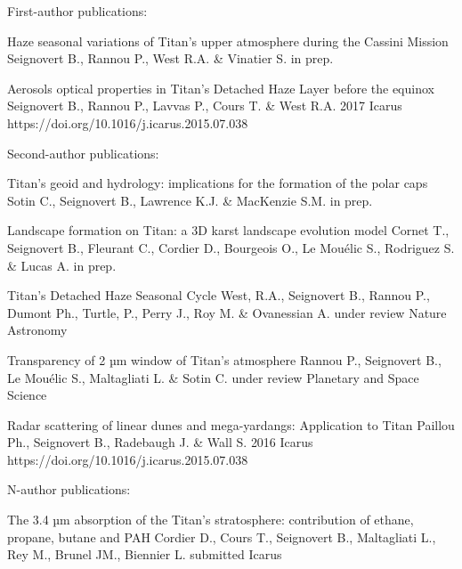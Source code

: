 
\begin{cvpublications}{First-author publications:}

		{Haze seasonal variations of Titan's upper atmosphere during the Cassini Mission}
		{Seignovert B., Rannou P., West R.A. \& Vinatier S.}
		{in prep.}
		{}{}

		{Aerosols optical properties in Titan's Detached Haze Layer before the equinox}
		{Seignovert B., Rannou P., Lavvas P., Cours T. \& West R.A.}
		{2017}
		{Icarus}
		{https://doi.org/10.1016/j.icarus.2015.07.038}

\end{cvpublications}

\begin{cvpublications}{Second-author publications:}

		{Titan’s geoid and hydrology: implications for the formation of the polar caps}
		{Sotin C., Seignovert B., Lawrence K.J. \& MacKenzie S.M.}
		{in prep.}
		{}{}

		{Landscape formation on Titan: a 3D karst landscape evolution model}
		{Cornet T., Seignovert B., Fleurant C., Cordier D., Bourgeois O., Le Mouélic S., Rodriguez S. \& Lucas A.}
		{in prep.}
		{}{}

		{Titan's Detached Haze Seasonal Cycle}
		{West, R.A., Seignovert B., Rannou P., Dumont Ph., Turtle,  P., Perry J., Roy M. \& Ovanessian A.}
		{under review}
		{Nature Astronomy}{}

		{Transparency of 2 µm window of Titan’s atmosphere}
		{Rannou P., Seignovert B., Le Mouélic S., Maltagliati L. \& Sotin C.}
		{under review}
		{Planetary and Space Science}{}

		{Radar scattering of linear dunes and mega-yardangs: Application to Titan}
		{Paillou Ph., Seignovert B., Radebaugh J. \& Wall S.}
		{2016}
		{Icarus}
		{https://doi.org/10.1016/j.icarus.2015.07.038}

\end{cvpublications}

\begin{cvpublications}{N-author publications:}

	{The 3.4 µm absorption of the Titan's stratosphere: contribution of ethane, propane, butane and PAH }
	{Cordier D., Cours T., Seignovert B., Maltagliati L., Rey M., Brunel JM., Biennier L.}
	{submitted}
	{Icarus}{}


\end{cvpublications}
